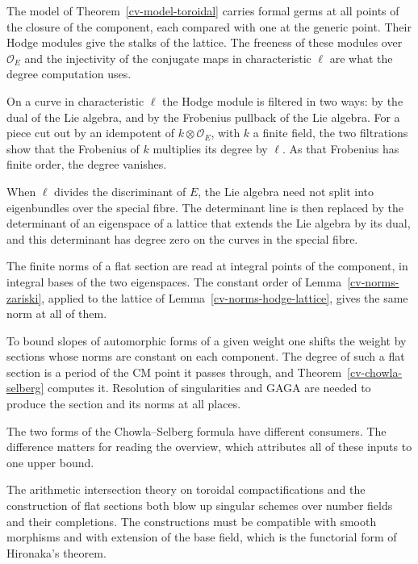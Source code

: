 The model of Theorem~\ref{cv-model-toroidal} carries formal germs at all points of the closure of the
component, each compared with one at the generic point. Their Hodge modules give the stalks of the
lattice. The freeness of these modules over $\mathcal O_E$ and the injectivity of the conjugate maps
in characteristic $\ell$ are what the degree computation uses.

On a curve in characteristic $\ell$ the Hodge module is filtered in two ways: by the dual of the Lie
algebra, and by the Frobenius pullback of the Lie algebra. For a piece cut out by an idempotent of
$k\otimes\mathcal O_E$, with $k$ a finite field, the two filtrations show that the Frobenius of $k$
multiplies its degree by $\ell$. As that Frobenius has finite order, the degree vanishes.

When $\ell$ divides the discriminant of $E$, the Lie algebra need not split into eigenbundles over the
special fibre. The determinant line is then replaced by the determinant of an eigenspace of a lattice
that extends the Lie algebra by its dual, and this determinant has degree zero on the curves in the
special fibre.

The finite norms of a flat section are read at integral points of the component, in integral bases of
the two eigenspaces. The constant order of Lemma~\ref{cv-norms-zariski}, applied to the lattice of
Lemma~\ref{cv-norms-hodge-lattice}, gives the same norm at all of them.

To bound slopes of automorphic forms of a given weight one shifts the weight by sections
whose norms are constant on each component. The degree of such a flat section is a
period of the CM point it passes through, and Theorem~\ref{cv-chowla-selberg} computes it.
Resolution of singularities and GAGA are needed to produce the section and its norms at
all places.

The two forms of the Chowla--Selberg formula have different consumers. The difference
matters for reading the overview, which attributes all of these inputs to one upper bound.

The arithmetic intersection theory on toroidal compactifications and the construction of
flat sections both blow up singular schemes over number fields and their completions.
The constructions must be compatible with smooth morphisms and with extension of the base
field, which is the functorial form of Hironaka's theorem.

